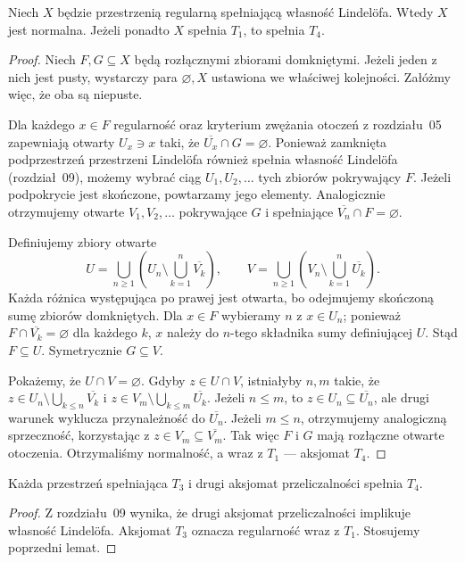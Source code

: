 \begin{lemat}
\label{lem:topog-t3-lindelof-normalna}
Niech $X$ będzie przestrzenią regularną spełniającą
własność Lindelöfa. Wtedy $X$ jest normalna. Jeżeli
ponadto $X$ spełnia $T_1$, to spełnia $T_4$.
\end{lemat}
\begin{proof}
Niech $F,G\subseteq X$ będą rozłącznymi zbiorami
domkniętymi. Jeżeli jeden z nich jest pusty, wystarczy
para $\varnothing,X$ ustawiona we właściwej kolejności.
Załóżmy więc, że oba są niepuste.

Dla każdego $x\in F$ regularność oraz kryterium zwężania
otoczeń z rozdziału~05 zapewniają otwarty $U_x\ni x$ taki,
że $\overline{U_x}\cap G=\varnothing$. Ponieważ zamknięta
podprzestrzeń przestrzeni Lindelöfa również spełnia
własność Lindelöfa (rozdział~09), możemy wybrać
ciąg $U_1,U_2,\ldots$ tych zbiorów pokrywający $F$.
Jeżeli podpokrycie jest skończone, powtarzamy jego elementy.
Analogicznie otrzymujemy otwarte $V_1,V_2,\ldots$ pokrywające
$G$ i spełniające $\overline{V_n}\cap F=\varnothing$.

Definiujemy zbiory otwarte
\[
U=\bigcup_{n\ge1}\left(U_n\setminus\bigcup_{k=1}^n
\overline{V_k}\right),\qquad
V=\bigcup_{n\ge1}\left(V_n\setminus\bigcup_{k=1}^n
\overline{U_k}\right).
\]
Każda różnica występująca po prawej jest otwarta,
bo odejmujemy skończoną sumę zbiorów domkniętych.
Dla $x\in F$ wybieramy $n$ z $x\in U_n$;
ponieważ $F\cap\overline{V_k}=\varnothing$ dla każdego $k$,
$x$ należy do $n$-tego składnika sumy definiującej $U$.
Stąd $F\subseteq U$. Symetrycznie $G\subseteq V$.

Pokażemy, że $U\cap V=\varnothing$. Gdyby $z\in U\cap V$,
istniałyby $n,m$ takie, że
$z\in U_n\setminus\bigcup_{k\le n}\overline{V_k}$
i $z\in V_m\setminus\bigcup_{k\le m}\overline{U_k}$.
Jeżeli $n\le m$, to $z\in U_n\subseteq\overline{U_n}$,
ale drugi warunek wyklucza przynależność do
$\overline{U_n}$. Jeżeli $m\le n$, otrzymujemy
analogiczną sprzeczność, korzystając z
$z\in V_m\subseteq\overline{V_m}$.
Tak więc $F$ i $G$ mają rozłączne otwarte otoczenia.
Otrzymaliśmy normalność, a wraz z $T_1$ — aksjomat $T_4$.
\end{proof}

\begin{wniosek}
\label{cor:topog-drugi-t3-t4}
Każda przestrzeń spełniająca $T_3$ i drugi aksjomat
przeliczalności spełnia $T_4$.
\end{wniosek}
\begin{proof}
Z rozdziału~09 wynika, że drugi aksjomat przeliczalności
implikuje własność Lindelöfa. Aksjomat $T_3$ oznacza
regularność wraz z $T_1$. Stosujemy poprzedni lemat.
\end{proof}


